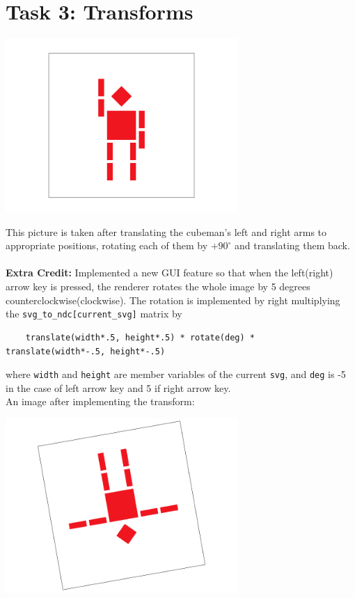 \documentclass[11pt]{article}
\begin{document}
\section{Task 3: Transforms}
{\centering\includegraphics[width=250pt]{screenshot_2-15_23-15-23.png}\par}
This picture is taken after translating the cubeman's left and right arms to appropriate positions, rotating each of them by $+90^\circ$ and translating them back.\\
\\\textbf{Extra Credit:} Implemented a new GUI feature so that when the left(right) arrow key is pressed, the renderer rotates the whole image by 5 degrees counterclockwise(clockwise). The rotation is implemented by right multiplying the \verb|svg_to_ndc[current_svg]| matrix by \begin{verbatim}
    translate(width*.5, height*.5) * rotate(deg) * translate(width*-.5, height*-.5)
\end{verbatim}where \verb|width| and \verb|height| are member variables of the current \verb|svg|, and \verb|deg| is -5 in the case of left arrow key and 5 if right arrow key.\\An image after implementing the transform:\\

{\centering\includegraphics[width=250pt]{screenshot_2-16_0-19-39.png}\par}
\end{document}
